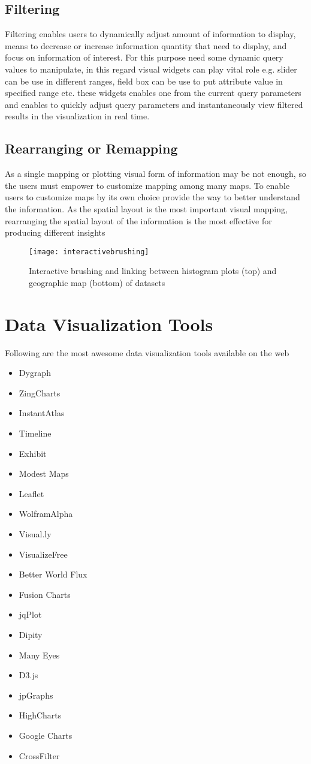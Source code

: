 \subsection{Filtering}
Filtering enables users to dynamically adjust amount of information to display, means to decrease or increase information quantity that need to display, and focus on information of interest. For this purpose need some dynamic query values to manipulate, in this regard visual widgets can play vital role e.g. slider can be use in different ranges, field box can be use to put attribute value in specified range etc. these widgets enables one from the current query parameters and enables to quickly adjust query parameters and instantaneously view filtered results in the visualization in real time.
\subsection{Rearranging or Remapping}
As a single mapping or plotting visual form of information may be not enough, so the users must empower to customize mapping among many maps. To enable users to customize maps by its own choice provide the way to better understand the information. As the spatial layout is the most important visual mapping, rearranging the spatial layout of the information is the most effective for producing different insights
\begin{figure}[h]
	\texttt{[image: interactivebrushing]}
	\centering
	\caption{Interactive brushing and linking between histogram plots (top) and geographic map (bottom) of datasets}
\end{figure}
\section{Data Visualization Tools}
Following are the most awesome data visualization tools available on the web
\begin{itemize}
	\item Dygraph
	\item ZingCharts
	\item InstantAtlas
	\item Timeline
	\item Exhibit
	\item Modest Maps
	\item Leaflet
	\item WolframAlpha
	\item Visual.ly
	\item VisualizeFree
	\item Better World Flux
	\item Fusion Charts
	\item jqPlot
	\item Dipity
	\item Many Eyes
	\item D3.js
	\item jpGraphs
	\item HighCharts
	\item Google Charts
	\item CrossFilter
\end{itemize}

